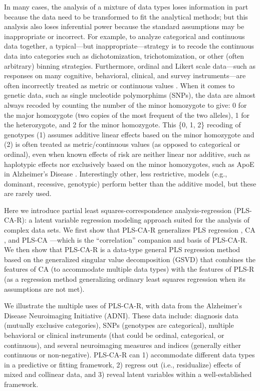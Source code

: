 \documentclass[12pt]{article}
\begin{document}
In many cases, the analysis of a mixture of data types loses information
in part because the data need to be transformed to fit the analytical
methods; but this analysis also loses inferential power because the
standard assumptions may be inappropriate or incorrect. For example, to
analyze categorical and continuous data together, a typical---but
inappropriate---strategy is to recode the continuous data into
categories such as dichotomization, trichotomization, or other (often
arbitrary) binning strategies. Furthermore, ordinal and Likert scale
data---such as responses on many cognitive, behavioral, clinical, and
survey instruments---are often incorrectly treated as metric or
continuous values \citep{burkner_ordinal_nodate}. When it comes to
genetic data, such as single nucleotide polymorphims (SNPs), the data
are almost always recoded by counting the number of the minor homozygote
to give: 0 for the major homozygote (two copies of the most frequent of
the two alleles), 1 for the heterozygote, and 2 for the minor
homozygote. This \{0, 1, 2\} recoding of genotypes (1) assumes additive
linear effects based on the minor homozygote and (2) is often treated as
metric/continuous values (as opposed to categorical or ordinal), even
when known effects of risk are neither linear nor additive, such as
haplotypic effects \citep{vormfelde_value_2007} nor exclusively based on
the minor homozygotes, such as ApoE in Alzheimer's Disease
\citep{genin_apoe_2011}. Interestingly other, less restrictive, models
(e.g., dominant, recessive, genotypic) perform better
\citep{lettre2007genetic} than the additive model, but these are rarely
used.

Here we introduce partial least squares-correspondence
analysis-regression (PLS-CA-R): a latent variable regression modeling
approach suited for the analysis of complex data sets. We first show
that PLS-CA-R generalizes PLS regression
\citep{wold1975soft, wold_collinearity_1984, tenenhaus_regression_1998, abdi_partial_2010-1},
CA
\citep{greenacre_theory_1984, greenacre_correspondence_2010-1, lebart_multivariate_1984},
and PLS-CA \citep{beaton_partial_2016}---which is the ``correlation''
companion and basis of PLS-CA-R. We then show that PLS-CA-R is a
data-type general PLS regression method based on the generalized
singular value decomposition (GSVD) that combines the features of CA (to
accommodate multiple data types) with the features of PLS-R (as a
regression method generalizing ordinary least squares regression when
its assumptions are not met).

We illustrate the multiple uses of PLS-CA-R, with data from the
Alzheimer's Disease Neuroimaging Initiative (ADNI). These data include:
diagnosis data (mutually exclusive categories), SNPs (genotypes are
categorical), multiple behavioral or clinical instruments (that could be
ordinal, categorical, or continuous), and several neuroimaging measures
and indices (generally either continuous or non-negative). PLS-CA-R can
1) accommodate different data types in a predictive or fitting
framework, 2) regress out (i.e., residualize) effects of mixed and
collinear data, and 3) reveal latent variables within a well-established
framework.
\end{document}
